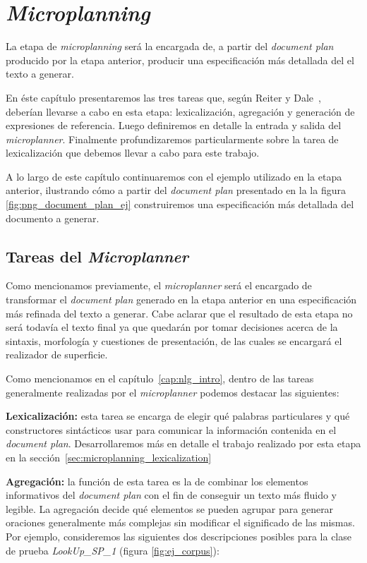 \chapter{\textit{Microplanning}}
\label{cap:microplanning}

La etapa de \textit{microplanning} será la encargada de, a partir del \textit{document plan} producido por la etapa anterior, producir una especificación más detallada del el texto a generar. 

En éste capítulo presentaremos las tres tareas que, según Reiter y Dale~\cite{reiter_dale}, deberían llevarse a cabo en esta etapa: lexicalización, agregación y generación de expresiones de referencia. Luego definiremos en detalle la entrada y salida del \textit{microplanner}. Finalmente profundizaremos particularmente sobre la tarea de lexicalización que debemos llevar a cabo para este trabajo.

A lo largo de este capítulo continuaremos con el ejemplo utilizado en la etapa anterior, ilustrando cómo a partir del \textit{document plan} presentado en la la figura \ref{fig:png_document_plan_ej} construiremos una especificación más detallada del documento a generar.

\section{Tareas del \textit{Microplanner}}

Como mencionamos previamente, el \textit{microplanner} será el encargado de transformar el \textit{document plan} generado en la etapa anterior en una especificación más refinada del texto a generar. Cabe aclarar que el resultado de esta etapa no será todavía el texto final ya que quedarán por tomar decisiones acerca de la sintaxis, morfología y cuestiones de presentación, de las cuales se encargará el realizador de superficie.

Como mencionamos en el capítulo~\ref{cap:nlg_intro}, dentro de las tareas generalmente realizadas por el \emph{microplanner} podemos destacar las siguientes:

\medskip
\noindent
\textbf{Lexicalización:} esta tarea se encarga de elegir qué palabras particulares y qué constructores sintácticos usar para comunicar la información contenida en el \textit{document plan}. Desarrollaremos más en detalle el trabajo realizado por esta etapa en la sección~\ref{sec:microplanning_lexicalization}


\medskip
\noindent
\textbf{Agregación:} la función de esta tarea es la de combinar los elementos informativos del \emph{document plan} con el fin de conseguir un texto más fluido y legible. La agregación decide qué elementos se pueden agrupar para generar oraciones generalmente más complejas sin modificar el significado de las mismas. Por ejemplo, consideremos las siguientes dos descripciones posibles para la clase de prueba \emph{LookUp\_SP\_1} (figura \ref{fig:ej_corpus}):


